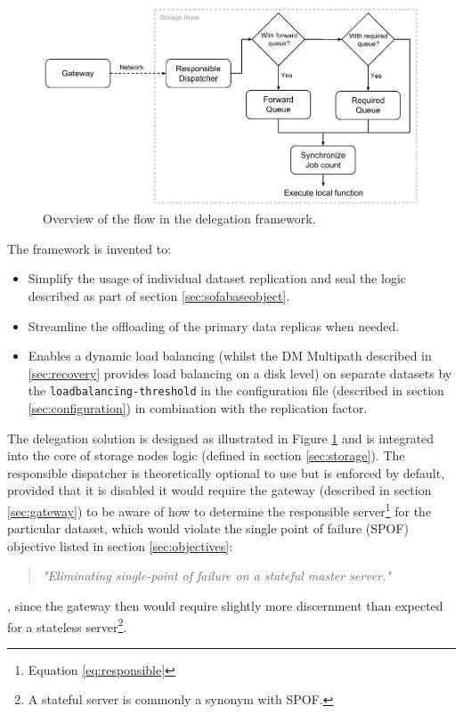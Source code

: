 \begin{figure}[ht!]
	\centering
	\includegraphics[scale=0.72]{pdf/delegation-framework.pdf}
	\caption[Overview of the delegation framework]{Overview of the flow in the delegation framework. \label{fig:delegation-framework}}
\end{figure}	

\noindent
The framework is invented to:
\begin{itemize}
	\item Simplify the usage of individual dataset replication and seal the logic described as part of section \ref{sec:sofabaseobject}.
	\item Streamline the offloading of the primary data replicas when needed.
	\item Enables a dynamic load balancing (whilst the DM Multipath described in \ref{sec:recovery} provides load balancing on a disk level) on separate datasets by the \texttt{load\-balancing-threshold} in the configuration file (described in section \ref{sec:configuration}) in combination with the replication factor.
\end{itemize}
\vspace*{4mm}
The delegation solution is designed as illustrated in Figure \ref{fig:delegation-framework} and is integrated into the core of storage nodes logic (defined in section \ref{sec:storage}). The responsible dispatcher is theoretically optional to use but is enforced by default, provided that it is disabled it would require the gateway (described in section \ref{sec:gateway}) to be aware of how to determine the responsible server\footnote{Equation \ref{eq:responsible}} for the particular dataset, which would violate the single point of failure (SPOF) objective listed in section \ref{sec:objectives}:
\begin{quotation}
\textit{"Eliminating single-point of failure on a stateful master server."}
\end{quotation}
, since the gateway then would require slightly more discernment than expected for a stateless server\footnote{\label{note:stateful}A stateful server is commonly a synonym with SPOF.}.
\newline

